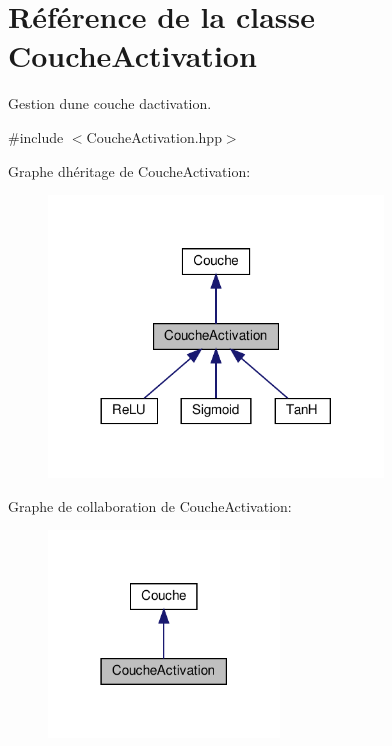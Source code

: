 \hypertarget{classCoucheActivation}{}\section{Référence de la classe Couche\+Activation}
\label{classCoucheActivation}


Gestion d\textquotesingle{}une couche d\textquotesingle{}activation.  




{\ttfamily \#include $<$Couche\+Activation.\+hpp$>$}



Graphe d\textquotesingle{}héritage de Couche\+Activation\+:
\nopagebreak
\begin{figure}[H]
\begin{center}
\leavevmode
\includegraphics[width=252pt]{classCoucheActivation__inherit__graph}
\end{center}
\end{figure}


Graphe de collaboration de Couche\+Activation\+:
\nopagebreak
\begin{figure}[H]
\begin{center}
\leavevmode
\includegraphics[width=174pt]{classCoucheActivation__coll__graph}
\end{center}
\end{figure}

